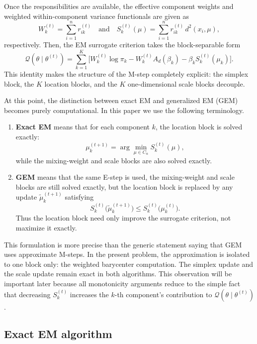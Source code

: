 \documentclass[11pt]{article}
\begin{document}
Once the responsibilities are available, the effective component weights and weighted within-component variance functionals are given as 
\begin{equation}
W_k^{(t)}=\sum_{i=1}^n r_{ik}^{(t)}\quad\text{and}\quad S_k^{(t)}(\mu)
=
\sum_{i=1}^n r_{ik}^{(t)}\,d^2(x_i,\mu),
\end{equation}
respectively. Then, the EM surrogate criterion takes the block-separable form
\begin{equation}\label{eq:Q-block-structure}
\mathcal{Q}(\theta\mid\theta^{(t)})
=
\sum_{k=1}^K
\Big[
W_k^{(t)}\log\pi_k
-
W_k^{(t)}A_d(\beta_k)
-
\beta_k S_k^{(t)}(\mu_k)
\Big].
\end{equation}
This identity makes the structure of the M-step completely explicit: the simplex block, the \(K\) location blocks, and the \(K\) one-dimensional scale blocks decouple.

At this point, the distinction between exact EM and generalized EM (GEM) becomes purely computational. In this paper we use the following terminology.
\begin{enumerate}[label=(\roman*)]
    \item \textbf{Exact EM} means that for each component \(k\), the location block is solved exactly:
    \[
    \mu_k^{(t+1)}=\arg\min_{\mu\in C_n} S_k^{(t)}(\mu),
    \]
    while the mixing-weight and scale blocks are also solved exactly.
    \item \textbf{GEM} means that the same E-step is used, the mixing-weight and scale blocks are still solved exactly, but the location block is replaced by any update \(\widetilde{\mu}_k^{(t+1)}\) satisfying
    \[
    S_k^{(t)}\bigl(\widetilde{\mu}_k^{(t+1)}\bigr)
    \le
    S_k^{(t)}\bigl(\mu_k^{(t)}\bigr).
    \]
    Thus the location block need only improve the surrogate criterion, not maximize it exactly.
\end{enumerate}

This formulation is more precise than the generic statement saying that  GEM uses approximate M-steps. In the present problem, the approximation is isolated to one block only: the weighted barycenter computation. The simplex update and the scale update remain exact in both algorithms. This observation will be important later because all monotonicity arguments reduce to the simple fact that decreasing \(S_k^{(t)}\) increases the $k$-th  component's contribution to \(\mathcal{Q}(\theta\mid\theta^{(t)})\).

\subsection{Exact EM algorithm}\label{subsec:exact-em}
\end{document}
